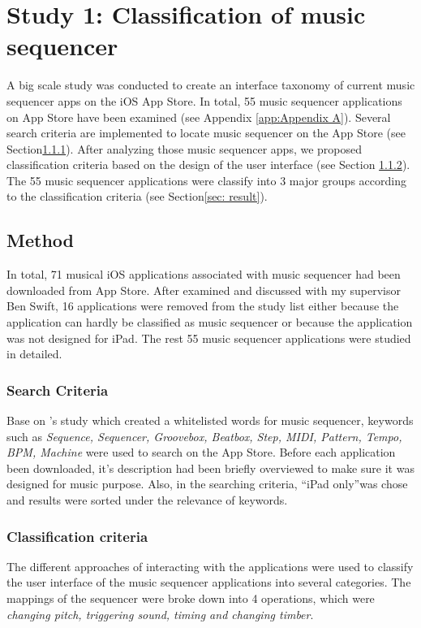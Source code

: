 \chapter{Study 1: Classification of music sequencer}
\label{ch: chapter 3}

A big scale study was conducted to create an interface taxonomy of current music sequencer apps on the iOS App Store. In total, 55 music sequencer applications on App Store have been examined (see Appendix \ref{app:Appendix A}). Several search criteria are implemented to locate music sequencer on the App Store (see Section\ref{subsec: search criteria}). After analyzing those music sequencer apps, we proposed classification criteria based on the design of the user interface (see Section \ref{sec: classify criteria}). The 55 music sequencer applications were classify into 3 major groups according to the classification criteria (see Section\ref{sec: result}).

\section{Method}
\label{sec:method}

In total, 71 musical iOS applications associated with music sequencer had been downloaded from App Store. After examined and discussed with my supervisor Ben Swift, 16 applications were removed from the study list either because the application can hardly be classified as music sequencer or because the application was not designed for iPad. The rest 55 music sequencer applications were studied in detailed.

\subsection{Search Criteria}
\label{subsec: search criteria}

Base on \citeauthor{Reference13}'s study which created a whitelisted words for music sequencer, keywords such as \textit{Sequence, Sequencer, Groovebox, Beatbox, Step, MIDI, Pattern, Tempo, BPM, Machine} were used to search on the App Store. Before each application been downloaded, it's description had been briefly overviewed to make sure it was designed for music purpose. Also, in the searching criteria, \textquotedblleft{iPad only}\textquotedblright was chose and results were sorted under the relevance of keywords.

\subsection{Classification criteria}
\label{sec: classify criteria}
The different approaches of interacting with the applications were used to classify the user interface of the music sequencer applications into several categories. The mappings of the sequencer were broke down into 4 operations,
which were \textit{changing pitch, triggering sound, timing and changing timber}.

